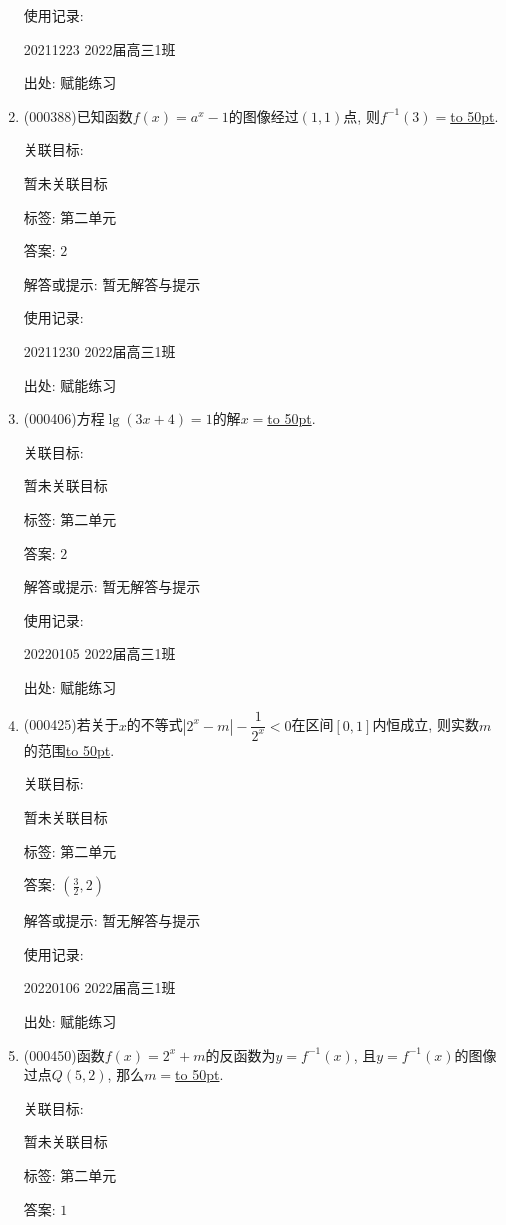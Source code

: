 \documentclass[10pt,a4paper]{article}
\newcommand{\blank}[1]{\underline{\hbox to #1pt{}}}
\begin{document}
\begin{enumerate}[1.]
使用记录:

20211223	2022届高三1班	


出处: 赋能练习
\item { (000388)}已知函数$f(x)=a^x-1$的图像经过$(1,1)$点, 则$f^{-1}(3)=$\blank{50}.


关联目标:

暂未关联目标



标签: 第二单元

答案: $2$

解答或提示: 暂无解答与提示

使用记录:

20211230	2022届高三1班	


出处: 赋能练习
\item { (000406)}方程$\lg (3x+4)=1$的解$x=$\blank{50}.


关联目标:

暂未关联目标



标签: 第二单元

答案: $2$

解答或提示: 暂无解答与提示

使用记录:

20220105	2022届高三1班	


出处: 赋能练习
\item { (000425)}若关于$x$的不等式$|2^x-m|-\dfrac1{2^x}<0$在区间$[0,1]$内恒成立, 则实数$m$的范围\blank{50}.


关联目标:

暂未关联目标



标签: 第二单元

答案: $(\frac 32,2)$

解答或提示: 暂无解答与提示

使用记录:

20220106	2022届高三1班	


出处: 赋能练习
\item { (000450)}函数$f(x)=2^x+m$的反函数为$y=f^{-1}(x)$, 且$y=f^{-1}(x)$的图像过点$Q(5,2)$, 那么$m=$\blank{50}.


关联目标:

暂未关联目标



标签: 第二单元

答案: $1$


\end{enumerate}
\end{document}
